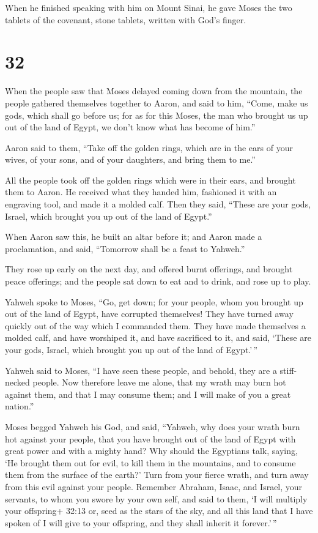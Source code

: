  When he finished speaking with him on Mount Sinai, he gave
Moses the two tablets of the covenant, stone tablets, written with God's
finger.

\hypertarget{section-31}{%
\section{32}\label{section-31}}

 When the people saw that Moses delayed coming down from the
mountain, the people gathered themselves together to Aaron, and said to
him, ``Come, make us gods, which shall go before us; for as for this
Moses, the man who brought us up out of the land of Egypt, we don't know
what has become of him.''

 Aaron said to them, ``Take off the golden rings, which are
in the ears of your wives, of your sons, and of your daughters, and
bring them to me.''

 All the people took off the golden rings which were in
their ears, and brought them to Aaron.  He received what
they handed him, fashioned it with an engraving tool, and made it a
molded calf. Then they said, ``These are your gods, Israel, which
brought you up out of the land of Egypt.''

 When Aaron saw this, he built an altar before it; and Aaron
made a proclamation, and said, ``Tomorrow shall be a feast to Yahweh.''

 They rose up early on the next day, and offered burnt
offerings, and brought peace offerings; and the people sat down to eat
and to drink, and rose up to play.

 Yahweh spoke to Moses, ``Go, get down; for your people,
whom you brought up out of the land of Egypt, have corrupted themselves!
 They have turned away quickly out of the way which I
commanded them. They have made themselves a molded calf, and have
worshiped it, and have sacrificed to it, and said, `These are your gods,
Israel, which brought you up out of the land of Egypt.'\,''

 Yahweh said to Moses, ``I have seen these people, and
behold, they are a stiff-necked people.  Now therefore
leave me alone, that my wrath may burn hot against them, and that I may
consume them; and I will make of you a great nation.''

 Moses begged Yahweh his God, and said, ``Yahweh, why does
your wrath burn hot against your people, that you have brought out of
the land of Egypt with great power and with a mighty hand? 
Why should the Egyptians talk, saying, `He brought them out for evil, to
kill them in the mountains, and to consume them from the surface of the
earth?' Turn from your fierce wrath, and turn away from this evil
against your people.  Remember Abraham, Isaac, and Israel,
your servants, to whom you swore by your own self, and said to them, `I
will multiply your offspring+ 32:13 or, seed as the stars of the sky,
and all this land that I have spoken of I will give to your offspring,
and they shall inherit it forever.'\,''

